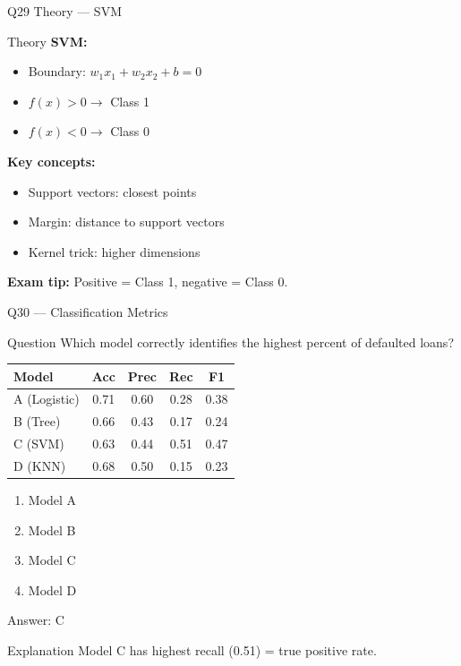 \documentclass[aspectratio=169,8pt]{beamer}
\begin{document}
	\begin{frame}{Q29 Theory --- SVM}
		\begin{block}{Theory}
			\textbf{SVM:}
			\begin{itemize}
				\item Boundary: $w_1x_1 + w_2x_2 + b = 0$
				\item $f(x) > 0 \rightarrow$ Class 1
				\item $f(x) < 0 \rightarrow$ Class 0
			\end{itemize}
			\textbf{Key concepts:}
			\begin{itemize}
				\item Support vectors: closest points
				\item Margin: distance to support vectors
				\item Kernel trick: higher dimensions
			\end{itemize}
			\textbf{Exam tip:} Positive = Class 1, negative = Class 0.
		\end{block}
	\end{frame}
	
	\begin{frame}{Q30 --- Classification Metrics}
		\begin{block}{Question}
			Which model correctly identifies the highest percent of defaulted loans?
			\begin{center}
				\small
				\begin{tabular}{@{}lcccc@{}}
					\toprule
					Model & Acc & Prec & Rec & F1 \\
					\midrule
					A (Logistic) & 0.71 & 0.60 & 0.28 & 0.38 \\
					B (Tree) & 0.66 & 0.43 & 0.17 & 0.24 \\
					C (SVM) & 0.63 & 0.44 & 0.51 & 0.47 \\
					D (KNN) & 0.68 & 0.50 & 0.15 & 0.23 \\
					\bottomrule
				\end{tabular}
			\end{center}
		\end{block}
		\begin{enumerate}[label=\Alph*.]
			\item Model A
			\item Model B
			\item Model C
			\item Model D
		\end{enumerate}
		\begin{exampleblock}{Answer: C}
		\end{exampleblock}
		\begin{block}{Explanation}
			Model C has highest recall (0.51) = true positive rate.
		\end{block}
	\end{frame}
	
\end{document}
